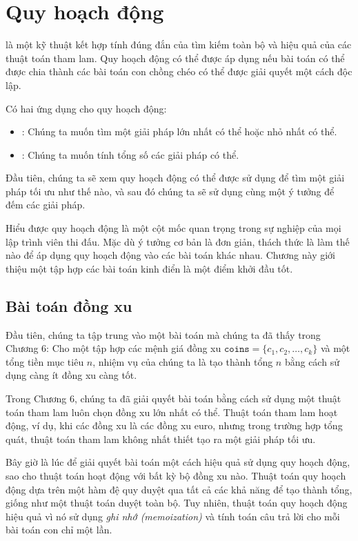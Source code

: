 \chapter{Quy hoạch động}


là một kỹ thuật kết hợp tính đúng đắn
của tìm kiếm toàn bộ và hiệu quả
của các thuật toán tham lam.
Quy hoạch động có thể được áp dụng nếu bài toán
có thể được chia thành các bài toán con chồng chéo
có thể được giải quyết một cách độc lập.

Có hai ứng dụng cho quy hoạch động:

\begin{itemize}
\item
{}:
Chúng ta muốn tìm một giải pháp
lớn nhất có thể hoặc nhỏ nhất có thể.
\item
{}:
Chúng ta muốn tính tổng số
các giải pháp có thể.
\end{itemize}

Đầu tiên, chúng ta sẽ xem quy hoạch động có thể được
sử dụng để tìm một giải pháp tối ưu như thế nào,
và sau đó chúng ta sẽ sử dụng cùng một ý tưởng để
đếm các giải pháp.

Hiểu được quy hoạch động là một cột mốc quan trọng
trong sự nghiệp của mọi lập trình viên thi đấu.
Mặc dù ý tưởng cơ bản là đơn giản,
thách thức là làm thế nào để áp dụng
quy hoạch động vào các bài toán khác nhau.
Chương này giới thiệu một tập hợp các bài toán kinh điển
là một điểm khởi đầu tốt.

\section{Bài toán đồng xu}

Đầu tiên, chúng ta tập trung vào một bài toán mà chúng ta
đã thấy trong Chương 6:
Cho một tập hợp các mệnh giá đồng xu $\texttt{coins} = \{c_1,c_2,\ldots,c_k\}$
và một tổng tiền mục tiêu $n$, nhiệm vụ của chúng ta là
tạo thành tổng $n$ bằng cách sử dụng càng ít đồng xu càng tốt.

Trong Chương 6, chúng ta đã giải quyết bài toán bằng cách sử dụng một
thuật toán tham lam luôn chọn đồng xu
lớn nhất có thể.
Thuật toán tham lam hoạt động, ví dụ,
khi các đồng xu là các đồng xu euro,
nhưng trong trường hợp tổng quát, thuật toán tham lam
không nhất thiết tạo ra một giải pháp tối ưu.

Bây giờ là lúc để giải quyết bài toán một cách hiệu quả
sử dụng quy hoạch động, sao cho thuật toán
hoạt động với bất kỳ bộ đồng xu nào.
Thuật toán quy hoạch động
dựa trên một hàm đệ quy
duyệt qua tất cả các khả năng để
tạo thành tổng, giống như một thuật toán duyệt toàn bộ.
Tuy nhiên, thuật toán quy hoạch động
hiệu quả vì
nó sử dụng \emph{ghi nhớ (memoization)} và
tính toán câu trả lời cho mỗi bài toán con chỉ một lần.

